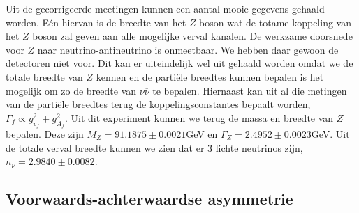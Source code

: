 \documentclass[../main.tex]{subfiles}
\begin{document}
Uit de gecorrigeerde meetingen kunnen een aantal mooie gegevens gehaald worden. Eén hiervan is de breedte van het $Z$ boson wat de totame koppeling van het $Z$ boson zal geven aan alle mogelijke verval kanalen. De werkzame doorsnede voor $Z$ naar neutrino-antineutrino is onmeetbaar. We hebben daar gewoon de detectoren niet voor. Dit kan er uiteindelijk wel uit gehaald worden omdat we de totale breedte van $Z$ kennen en de partiële breedtes kunnen bepalen is het mogelijk om zo de breedte van $\nu\overline \nu$ te bepalen. Hiernaast kan uit al die metingen van de partiële breedtes terug de koppelingsconstantes bepaalt worden, $\Gamma_f \propto g_{v_f}^2+g_{A_f}^2$. Uit dit experiment kunnen we terug de massa en breedte van $Z$ bepalen. Deze zijn $M_Z = 91.1875 \pm 0.0021$GeV en $\Gamma_Z = 2.4952 \pm 0.0023$GeV. Uit de totale verval breedte kunnen we zien dat er 3 lichte neutrinos zijn, $n_\nu = 2.9840 \pm 0.0082$.

\subsection{Voorwaards-achterwaardse asymmetrie}%
\label{sub:voorwaards_achterwaardse_asymmetrie}
\end{document}
